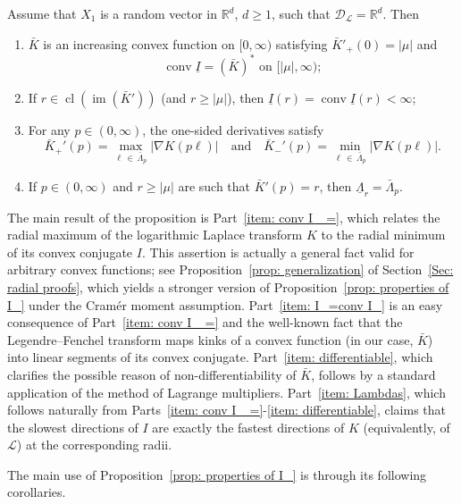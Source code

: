 \documentclass[10pt]{amsart}
\theoremstyle{definition}\newtheorem{defi}[theo]{Definition}\newtheorem{rema}[theo]{Remark}\newtheorem{exam}[theo]{Example}\newtheorem{exem}[theo]{Example}\newtheorem{nota}[theo]{Notation}
\DeclareMathOperator{\conv}{conv}
\DeclareMathOperator{\im}{im}
\DeclareMathOperator{\cl}{cl}
\newcommand{\ubar}[1]{\underline{#1}}
\newcommand{\Rbb}{\mathbb{R}}
\newcommand{\Dcl}{\mathcal{D}}
\newcommand{\Lcl}{\mathcal{L}}
\newcommand*{\alphenumi}{\renewcommand*{\theenumi}{\alph{enumi}}}
\begin{document}
\begin{prop}\label{prop: properties of I_}
Assume that $X_1$ is a random vector in $\Rbb^d$, $d \ge 1$, such that $\Dcl_{\Lcl} = \Rbb^d$. Then
\begin{enumerate}\alphenumi
\item \label{item: conv I_ =}
$\bar K$ is an increasing convex function on $[0, \infty)$ satisfying $\bar K'_+(0)=|\mu|$ and
\[
\conv \ubar I = (\bar{K})^* \text{ on }[|\mu|, \infty);
\]
\item \label{item: I_=conv I_}
If $r \in \cl (\im(\bar{K}'))$ (and $r \ge |\mu|$), then $\ubar I(r) = \conv \ubar I(r)<\infty$;
\item \label{item: differentiable}
For any $p \in (0,\infty)$, the one-sided derivatives satisfy
\[
\bar K_+'(p) = \max_{\ell\,\in\,\bar{\Lambda}_p} \left|\nabla K(p \ell)\right| \quad \text{and} \quad \bar K_-'(p) = \min_{\ell\,\in\,\bar{\Lambda}_p} |\nabla K (p \ell)|.
\]
\item \label{item: Lambdas}
If $p \in (0,\infty)$ and $r \ge |\mu|$ are such that $\bar{K}'(p)=r$, then $\ubar{\Lambda}_r = \bar{\Lambda}_p$.
\end{enumerate}
\end{prop}

The main result of the proposition is Part~\eqref{item: conv I_ =}, which relates the radial maximum of the logarithmic Laplace transform $K$ to the radial minimum of its convex conjugate $I$. This assertion is actually a general fact valid for arbitrary convex functions; see Proposition~\ref{prop: generalization} of Section~\ref{Sec: radial proofs}, which yields a stronger version of Proposition~\ref{prop: properties of I_} under the Cram\'er moment assumption. Part~\eqref{item: I_=conv I_} is an easy consequence of Part~\eqref{item: conv I_ =} and the well-known fact that the Legendre--Fenchel transform maps kinks of a convex function (in our case, $\bar K$) into linear segments of its convex conjugate. Part~\eqref{item: differentiable}, which clarifies the possible reason of non-differentiability of $\bar K$, follows by a standard application of the method of Lagrange multipliers. Part~\eqref{item: Lambdas}, which follows naturally from Parts~\eqref{item: conv I_ =}-\eqref{item: differentiable}, claims that the slowest directions of $I$ are exactly the fastest directions of $K$ (equivalently, of $\Lcl$) at the corresponding radii.

The main use of Proposition~\ref{prop: properties of I_} is through its following corollaries.
\end{document}
